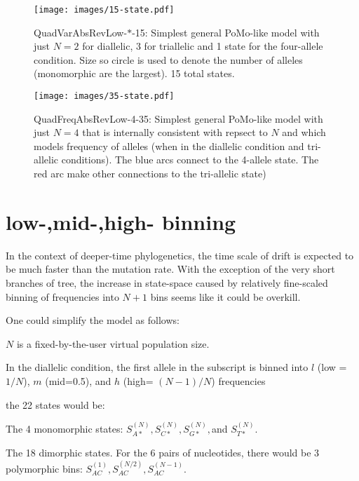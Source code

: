 \documentclass{llncs}
\newcommand{\virtPopSize}{\ensuremath{N}}
\newcommand{\pomo}{PoMo\xspace}
\begin{document}
\begin{figure}
    \begin{center}
        \texttt{[image: images/15-state.pdf]}
        \caption{QuadVarAbsRevLow-$\ast$-15: Simplest general \pomo-like model with just $\virtPopSize=2$ for diallelic, 3 for triallelic and 1 state for the four-allele condition. Size so circle is used to denote the number of alleles (monomorphic are the largest). 15 total states.}\label{pomoQuadVarAbsRevLow}
    \end{center}
\end{figure}

\begin{figure}
    \begin{center}
        \texttt{[image: images/35-state.pdf]}
        \caption{QuadFreqAbsRevLow-4-35: Simplest general \pomo-like model with just $\virtPopSize=4$ that is internally consistent with repsect to $\virtPopSize$ and which models frequency of alleles (when in the diallelic condition and tri-allelic conditions). The blue arcs connect to the 4-allele state. The red arc  make other connections to the tri-allelic state)}\label{pomoQuadVarAbsRevLow}
    \end{center}
\end{figure}

\newpage
\section*{low-,mid-,high- binning}
In the context of deeper-time phylogenetics, the time scale of drift
    is expected to be much faster than the mutation rate.
With the exception of the very short branches of tree, the increase
    in state-space caused by relatively fine-scaled binning of frequencies
    into $N+1$ bins seems like it could be overkill.

One could simplify the model as follows:
\begin{compactitem}
    \item $N$ is a fixed-by-the-user virtual population size.
    \item In the diallelic condition, the first allele in the subscript is binned into $l$ (low = $1/N$), $m$ (mid=0.5), and $h$ (high= $(N-1)/N$) frequencies
\end{compactitem}
the 22 states would be:
\begin{compactitem}
    \item The 4 monomorphic states: $S_{A\ast}^{(N)}, S_{C\ast}^{(N)}, S_{G\ast}^{(N)}, $and $ S_{T\ast}^{(N)}$.
    \item The 18 dimorphic states. For the 6 pairs of nucleotides, there would be 3 polymorphic bins: $S_{AC}^{(1)}, S_{AC}^{(N/2)}, S_{AC}^{(N-1)}$.
\end{compactitem}
\end{document}
